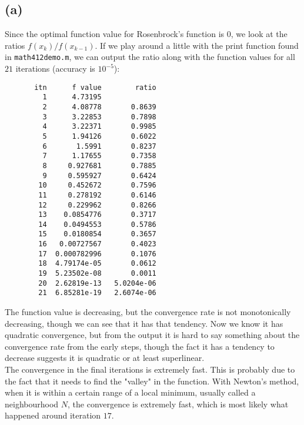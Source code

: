 \documentclass[a4paper, fleqn]{article}
\begin{document}
\subsection{(a)}
Since the optimal function value for Rosenbrock's function is $0$, we look at the ratios $f(x_k)/f(x_{k-1})$. If we play around a little with the print function found in \texttt{math412demo.m}, we can output the ratio along with the function values for all $21$ iterations (accuracy is $10^{-5}$):
\begin{verbatim}
       itn      f value        ratio
         1      4.73195
         2      4.08778       0.8639
         3      3.22853       0.7898
         4      3.22371       0.9985
         5      1.94126       0.6022
         6       1.5991       0.8237
         7      1.17655       0.7358
         8     0.927681       0.7885
         9     0.595927       0.6424
        10     0.452672       0.7596
        11     0.278192       0.6146
        12     0.229962       0.8266
        13    0.0854776       0.3717
        14    0.0494553       0.5786
        15    0.0180854       0.3657
        16   0.00727567       0.4023
        17  0.000782996       0.1076
        18  4.79174e-05       0.0612
        19  5.23502e-08       0.0011
        20  2.62819e-13   5.0204e-06
        21  6.85281e-19   2.6074e-06
\end{verbatim}
The function value is decreasing, but the convergence rate is not monotonically decreasing, though we can see that it has that tendency. Now we know it has quadratic convergence, but from the output it is hard to say something about the convergence rate from the early steps, though the fact it has a tendency to decrease suggests it is quadratic or at least superlinear. \\
The convergence in the final iterations is extremely fast. This is probably due to the fact that it needs to find the "valley" in the function. With Newton's method, when it is within a certain range of a local minimum, usually called a neighbourhood $N$, the convergence is extremely fast, which is most likely what happened around iteration $17$.
\end{document}
